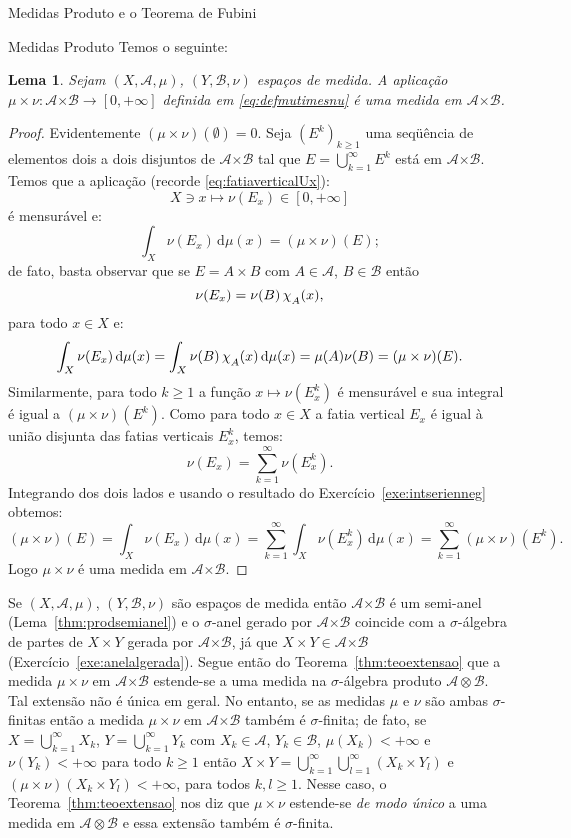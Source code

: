 \documentclass[oneside,final,11pt]{amsbook}
\newcommand{\Times}{\pmb{\times}}
\newcommand{\dd}{\mathrm d}
\newcommand{\chilow}[1]{\chi_{\lower2pt\hbox{$\scriptstyle#1$}}}
\theoremstyle{remark}\newtheorem{exercise}{Exercício}[chapter]
\theoremstyle{remark}\newtheorem{*exercise}[exercise]{\hbox to 0pt{\hskip 0pt minus 1fil*}Exercício}
\theoremstyle{definition}\newtheorem{exdefin}{Definição}[chapter]
\theoremstyle{plain}\newtheorem{teo}{Teorema}[section]
\theoremstyle{plain}\newtheorem{lem}[teo]{Lema}
\theoremstyle{plain}\newtheorem{prop}[teo]{Proposição}
\theoremstyle{plain}\newtheorem{cor}[teo]{Corolário}
\theoremstyle{definition}\newtheorem{defin}[teo]{Definição}
\theoremstyle{remark}\newtheorem{rem}[teo]{Observação}
\theoremstyle{definition}\newtheorem{notation}[teo]{Notação}
\theoremstyle{definition}\newtheorem{convention}[teo]{Convenção}
\theoremstyle{definition}\newtheorem{example}[teo]{Exemplo}
\numberwithin{section}{chapter}
\numberwithin{equation}{section}
\begin{document}
\begin{chapter}{Medidas Produto e o Teorema de Fubini}
\begin{section}{Medidas Produto}
Temos o seguinte:
\begin{lem}\label{thm:mutimesnuehmedida}
Sejam $(X,\mathcal A,\mu)$, $(Y,\mathcal B,\nu)$ espaços de medida.
A aplicação $\mu\times\nu:\mathcal A\Times\mathcal B\to[0,+\infty]$ definida
em \eqref{eq:defmutimesnu} é uma medida em $\mathcal A\Times\mathcal B$.
\end{lem}
\begin{proof}
Evidentemente $(\mu\times\nu)(\emptyset)=0$. Seja $(E^k)_{k\ge1}$ uma seqüência
de elementos dois a dois disjuntos de $\mathcal A\Times\mathcal B$ tal que
$E=\bigcup_{k=1}^\infty E^k$ está em $\mathcal A\Times\mathcal B$. Temos
que a aplicação (recorde \eqref{eq:fatiaverticalUx}):
\[X\ni x\longmapsto\nu(E_x)\in[0,+\infty]\]
é mensurável e:
\[\int_X\nu(E_x)\,\dd\mu(x)=(\mu\times\nu)(E);\]
de fato, basta observar que se $E=A\times B$ com $A\in\mathcal A$, $B\in\mathcal B$ então
\[\nu(E_x)=\nu(B)\,\chilow A(x),\]
para todo $x\in X$ e:
\[\int_X\nu(E_x)\,\dd\mu(x)=\int_X\nu(B)\,\chilow A(x)\,\dd\mu(x)=\mu(A)\nu(B)=(\mu\times\nu)(E).\]
Similarmente, para todo $k\ge1$ a função $x\mapsto\nu(E^k_x)$ é mensurável
e sua integral é igual a $(\mu\times\nu)(E^k)$. Como para todo $x\in X$ a fatia vertical
$E_x$ é igual à união disjunta das fatias verticais $E^k_x$, temos:
\[\nu(E_x)=\sum_{k=1}^\infty\nu(E^k_x).\]
Integrando dos dois lados e usando o resultado do Exercício~\ref{exe:intserienneg} obtemos:
\[(\mu\times\nu)(E)=\int_X\nu(E_x)\,\dd\mu(x)=\sum_{k=1}^\infty\int_X\nu(E^k_x)\,\dd\mu(x)
=\sum_{k=1}^\infty(\mu\times\nu)(E^k).\]
Logo $\mu\times\nu$ é uma medida em $\mathcal A\Times\mathcal B$.
\end{proof}

Se $(X,\mathcal A,\mu)$, $(Y,\mathcal B,\nu)$ são espaços de medida então
$\mathcal A\Times\mathcal B$ é um semi-anel (Lema~\ref{thm:prodsemianel})
e o $\sigma$-anel gerado por $\mathcal A\Times\mathcal B$ coincide com a $\sigma$-álgebra
de partes de $X\times Y$ gerada por $\mathcal A\Times\mathcal B$, já que
$X\times Y\in\mathcal A\Times\mathcal B$ (Exercício~\ref{exe:anelalgerada}).
Segue então do Teorema~\ref{thm:teoextensao} que a medida $\mu\times\nu$ em $\mathcal A\Times\mathcal B$
estende-se a uma medida na $\sigma$-álgebra produto $\mathcal A\otimes\mathcal B$.
Tal extensão não é única em geral. No entanto, se as medidas $\mu$ e $\nu$ são ambas $\sigma$-finitas
então a medida $\mu\times\nu$ em $\mathcal A\Times\mathcal B$ também é $\sigma$-finita;
de fato, se $X=\bigcup_{k=1}^\infty X_k$, $Y=\bigcup_{k=1}^\infty Y_k$ com
$X_k\in\mathcal A$, $Y_k\in\mathcal B$, $\mu(X_k)<+\infty$ e $\nu(Y_k)<+\infty$
para todo $k\ge1$ então $X\times Y=\bigcup_{k=1}^\infty\bigcup_{l=1}^\infty(X_k\times Y_l)$
e $(\mu\times\nu)(X_k\times Y_l)<+\infty$, para todos $k,l\ge1$. Nesse caso,
o Teorema~\ref{thm:teoextensao} nos diz que $\mu\times\nu$ estende-se {\em de modo único\/}
a uma medida em $\mathcal A\otimes\mathcal B$ e essa extensão também é $\sigma$-finita.


\end{section}
\end{chapter}
\end{document}
